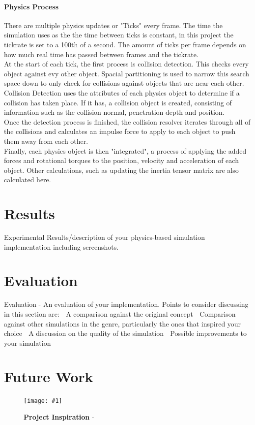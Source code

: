 \documentclass[conference]{acmsiggraph}
\newcommand{\figuremacroW}[4]{
	\begin{figure}[h] %
		\centering
		\texttt{[image: \#1]}
		\caption[#2]{\textbf{#2} - #3}
		\label{fig:#1}
	\end{figure}
}
\begin{document}
\paragraph{Physics Process}
There are multiple physics updates or "Ticks" every frame. The time the simulation uses as the the time between ticks is constant, in this project the tickrate	is set to a 100th of a second. The amount of ticks per frame depends on how much real time has passed between frames and the tickrate.\\	
At the start of each tick, the first process is collision detection. This checks every object against evy other object. Spacial partitioning is used to narrow this search space down to only check for collisions against objects that are near each other.
\\
Collision Detection uses the attributes of each physics object to determine if a collision has taken place. If it has, a collision object is created, consisting of information such as the collision normal, penetration depth and position.
\\
Once the detection process is finished, the collision resolver iterates through all of the collisions and calculates an impulse force to apply to each object to push them away from each other.
\\
Finally, each physics object is then "integrated", a process of applying the added forces and rotational torques to the position, velocity and acceleration of each object. Other calculations, such as updating the inertia tensor matrix are also calculated here.
	
\section{Results}
Experimental Results/description of your physics-based simulation implementation
including screenshots.

\section{Evaluation}
Evaluation - An evaluation of your implementation. Points to consider discussing in this
section are:
 A comparison against the original concept
 Comparison against other simulations in the genre, particularly the ones that
inspired your choice
 A discussion on the quality of the simulation
 Possible improvements to your simulation

\section{Future Work}


\figuremacroW
{balls2}
{Project Inspiration}
{\protect\cite{advert}}
{0.96}





\end{document}
